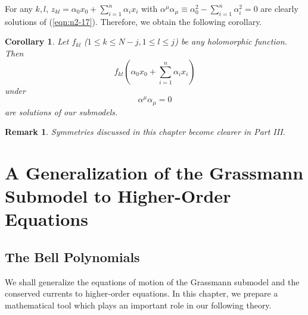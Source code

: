 \documentclass[makeidx,12pt,openany]{report}
\newtheorem{rmk}[df]{Remark}
\newtheorem{cor}[df]{Corollary}
\begin{document}
For any $k,l$, $z_{kl}=\alpha_0 x_0+\sum_{i=1}^n \alpha_i x_i$ with 
$\alpha^{\mu}\alpha_{\mu} \equiv \alpha_0^2-\sum_{i=1}^n \alpha_i^2=0$ 
are clearly solutions of (\ref{eqn:n2-17}). 
Therefore, we obtain the following corollary. 
\begin{cor}
Let $f_{kl}$ ($1 \le k \le N-j, 1 \le l \le j$) be any holomorphic 
function. Then
\begin{equation}
 f_{kl}(\alpha_0 x_0+\sum_{i=1}^n \alpha_i x_i)
 \label{eqn:sol0}
\end{equation}
under
\begin{equation}
 \alpha^{\mu}\alpha_{\mu}=0
\end{equation}
are solutions of our submodels.
\end{cor}
\begin{rmk}
Symmetries discussed in this chapter become clearer in Part III. 
\end{rmk}

\part{A Generalization of the Grassmann Submodel to Higher-Order Equations}

\chapter{The Bell Polynomials}
We shall generalize the equations of motion of the Grassmann submodel and 
the conserved currents to higher-order equations. In this chapter, 
we prepare a 
mathematical tool which plays an important role in our following theory. 
\end{document}
